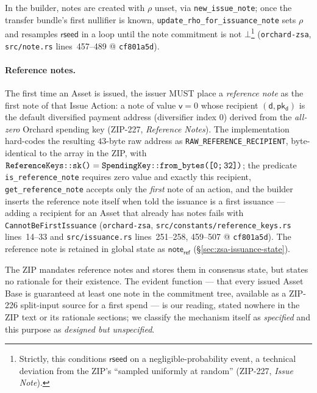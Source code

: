 \documentclass[11pt,a4paper]{article}
\theoremstyle{definition}
\newcommand{\pkd}{\ensuremath{\mathsf{pk_d}}}
\begin{document}
In the builder, notes are created with $\rho$ unset, via
\texttt{new\_issue\_note}; once the transfer bundle's first nullifier
is known, \texttt{update\_rho\_for\_issuance\_note} sets $\rho$ and
resamples $\mathsf{rseed}$ in a loop until the note commitment is not
$\bot$\footnote{Strictly, this conditions $\mathsf{rseed}$ on a
negligible-probability event, a technical deviation from the ZIP's
``sampled uniformly at random'' (ZIP-227, \emph{Issue Note}).}
(\texttt{orchard-zsa}, \texttt{src/note.rs} lines~457--489 @
\texttt{cf801a5d}).

\paragraph{Reference notes.} The first time an Asset is issued, the
issuer MUST place a \emph{reference note} as the first note of that
Issue Action: a note of value $\mathsf{v} = 0$ whose recipient
$(\mathsf{d}, \pkd)$ is the default diversified payment address
(diversifier index $0$) derived from the \emph{all-zero} Orchard spending
key (ZIP-227, \emph{Reference Notes}). The implementation hard-codes the
resulting $43$-byte raw address as \texttt{RAW\_REFERENCE\_RECIPIENT},
byte-identical to the array in the ZIP, with
$\texttt{ReferenceKeys::sk()} =
\texttt{SpendingKey::from\_bytes([0;\,32])}$; the predicate
\texttt{is\_reference\_note} requires zero value and exactly this
recipient, \texttt{get\_reference\_note} accepts only the \emph{first}
note of an action, and the builder inserts the reference note itself when
told the issuance is a first issuance --- adding a recipient for an Asset
that already has notes fails with \texttt{CannotBeFirstIssuance}
(\texttt{orchard-zsa}, \texttt{src/constants/reference\_keys.rs}
lines~14--33 and \texttt{src/issuance.rs} lines~251--258, 459--507 @
\texttt{cf801a5d}). The reference note is retained in global state as
$\mathsf{note_{ref}}$ (\S\ref{sec:zsa-issuance-state}).

The ZIP mandates reference notes and stores them in consensus state, but
states no rationale for their existence. The evident function --- that
every issued Asset Base is guaranteed at least one note in the commitment
tree, available as a ZIP-226 split-input source for a first spend --- is
our reading, stated nowhere in the ZIP text or its rationale sections; we
classify the mechanism itself as \emph{specified} and this purpose as
\emph{designed but unspecified}.
\end{document}
